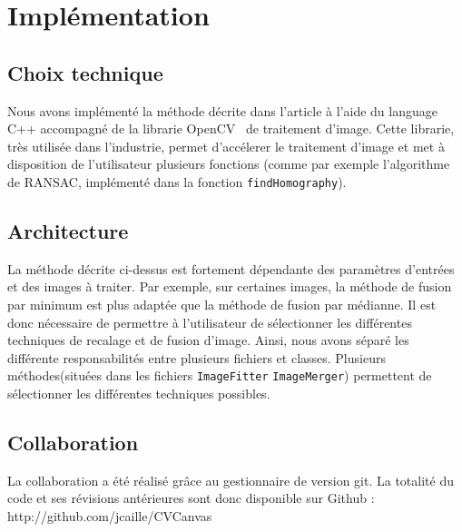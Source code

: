 \documentclass[12pt,a4paper]{article}
\begin{document}
\section{Implémentation}

\subsection{Choix technique}
Nous avons implémenté la méthode décrite dans l'article à l'aide du language C++ accompagné de la librarie OpenCV~\citep{opencv_library} de traitement d'image. Cette librarie, très utilisée dans l'industrie, permet d'accélerer le traitement d'image et met à disposition de l'utilisateur plusieurs fonctions (comme par exemple l'algorithme de RANSAC, implémenté dans la fonction \texttt{findHomography}).

\subsection{Architecture}
La méthode décrite ci-dessus est fortement dépendante des paramètres d'entrées et des images à traiter. Par exemple, sur certaines images, la méthode de fusion par minimum est plus adaptée que la méthode de fusion par médianne. Il est donc nécessaire de permettre à l'utilisateur de sélectionner les différentes techniques de recalage et de fusion d'image. Ainsi, nous avons séparé les différente responsabilités entre plusieurs fichiers et classes. Plusieurs méthodes(situées dans les fichiers \texttt{ImageFitter} \texttt{ImageMerger}) permettent de sélectionner les différentes techniques possibles. 

\subsection{Collaboration}
La collaboration a été réalisé grâce au gestionnaire de version git. La totalité du code et ses révisions antérieures sont donc disponible sur Github : http://github.com/jcaille/CVCanvas

\end{document}
